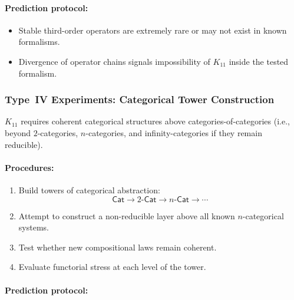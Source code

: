 \paragraph{Prediction protocol:}

\begin{itemize}
    \item Stable third-order operators are extremely rare or may not 
          exist in known formalisms.
    \item Divergence of operator chains signals impossibility of 
          $K_{11}$ inside the tested formalism.
\end{itemize}



\subsubsection{Type~IV Experiments: Categorical Tower Construction}

$K_{11}$ requires coherent categorical structures above 
categories-of-categories (i.e., beyond $2$-categories, $n$-categories, 
and infinity-categories if they remain reducible).

\paragraph{Procedures:}

\begin{enumerate}
    \item Build towers of categorical abstraction:
          \[
              \mathsf{Cat}
              \rightarrow
              2\text{-}\mathsf{Cat}
              \rightarrow
              n\text{-}\mathsf{Cat}
              \rightarrow
              \cdots
          \]
    \item Attempt to construct a non-reducible layer above all 
          known $n$-categorical systems.
    \item Test whether new compositional laws remain coherent.
    \item Evaluate functorial stress at each level of the tower.
\end{enumerate}

\paragraph{Prediction protocol:}

